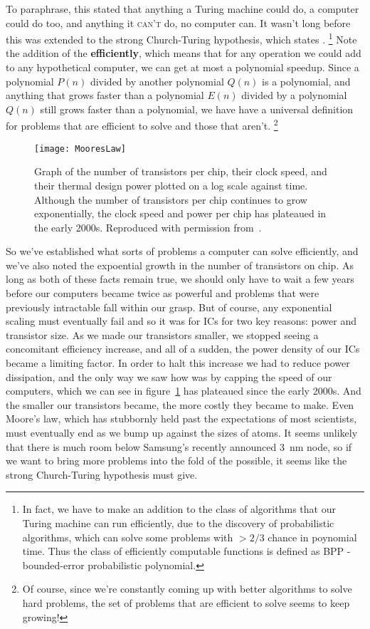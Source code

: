 To paraphrase, this stated that anything a Turing machine could do, a computer could do too, and anything
it \textsc{can't} do, no computer can. It wasn't long before this was extended to the strong Church-Turing
hypothesis, which states .
\footnote{In fact, we have to make an addition to the class of algorithms that our Turing machine can run efficiently,
 due to the discovery of probabilistic algorithms, which can solve some problems with $> 2/3$ chance in
 poynomial time. Thus the class of efficiently computable functions is defined as \textsc{BPP} - 
 bounded-error probabilistic polynomial.}
Note the addition of the \textbf{efficiently}, which means that for any
operation we could add to any hypothetical computer, we can get at most a polynomial speedup. Since
a polynomial $P(n)$ divided by another polynomial $Q(n)$ is a polynomial, and anything that grows faster
than a polynomial $E(n)$ divided by a polynomial $Q(n)$ still grows faster than a polynomial, we have
have a universal definition for problems that are efficient to solve and those that aren't.
\footnote{Of course, since we're constantly coming up with better algorithms to solve hard problems,
the set of problems that are efficient to solve seems to keep growing!}


\begin{figure}
  \texttt{[image: MooresLaw]}
  \caption{Graph of the number of transistors per chip, their clock speed, and their
  thermal design power plotted on a log scale against time. Although the number of transistors per chip
  continues to grow exponentially, the clock speed and power per chip has plateaued in the early 2000s.
  Reproduced with permission from~\cite{cross_2016}.}
  \label{fig:mooreslaw}
\end{figure}

So we've established what sorts of problems a computer can solve efficiently, and we've also noted the
expoential growth in the number of transistors on chip. As long as both of these facts remain true, we
should only have to wait a few years before our computers became twice as powerful and problems that were
previously intractable fall within our grasp. But of course, any exponential scaling must eventually fail
and so it was for ICs for two key reasons: power and transistor size. As we made our transistors smaller,
we stopped seeing a concomitant efficiency increase, and all of a sudden, the power density of our ICs 
became a limiting factor. In order to halt this increase we had to reduce power dissipation, and the
only way we saw how was by capping the speed of our computers, which we can see in figure~\ref{fig:mooreslaw}
has plateaued since the early 2000s. And the smaller our transistors became, the more costly they became 
to make. Even Moore's law, which has stubbornly held past the expectations of most scientists, must eventually
end as we bump up against the sizes of atoms. It seems unlikely that there is much room below Samsung's 
recently announced \SI{3}{\nano\meter} node, so if we want to bring more problems into the fold of the
possible, it seems like the strong Church-Turing hypothesis must give.

